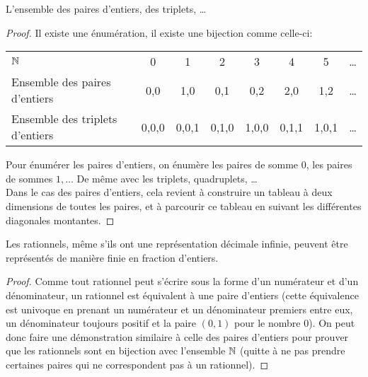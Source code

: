 \begin{myexem}
\label{exem:paire_entiers}
  L'ensemble des paires d'entiers, des triplets, \ldots
    \begin{proof}
        Il existe une énumération, il existe une bijection comme celle-ci:

		\begin{tabular}{ l c c  c  c c c  r }
			$\mathbb{N}$  & 0 & 1 & 2  & 3 & 4 & 5 & \ldots  \\
			Ensemble des paires d'entiers & {0,0} & {1,0} & {0,1} & {0,2} & {2,0} & {1,2}  & \ldots \\
			Ensemble des triplets d'entiers & {0,0,0} & {0,0,1} & {0,1,0} & {1,0,0} & {0,1,1} & {1,0,1}  & \ldots \\

		\end{tabular}

	Pour énumérer les paires d'entiers, on énumère les paires de somme 0, les paires de sommes $1, \ldots$ De même avec les triplets, quadruplets, \dots \\
	Dans le cas des paires d'entiers, cela revient à construire un tableau à deux dimensions de toutes les paires, et à parcourir ce tableau en suivant les différentes diagonales montantes.
    \end{proof}
\end{myexem}

\begin{myexem}
 Les rationnels, même s'ils ont une représentation décimale infinie, peuvent être représentés de manière finie en fraction d'entiers.
	 \begin{proof}
	 	 Comme tout rationnel peut s'écrire sous la forme d'un numérateur et d'un dénominateur, un rationnel est équivalent à une paire d'entiers (cette équivalence est univoque en prenant un numérateur et un dénominateur premiers entre eux, un dénominateur toujours positif et la paire $(0,1)$ pour le nombre $0$). On peut donc faire une démonstration similaire à celle des paires d'entiers pour prouver que les rationnels sont en bijection avec l'ensemble $\mathbb{N}$ (quitte à ne pas prendre certaines paires qui ne correspondent pas à un rationnel).
	 \end{proof}
 \end{myexem}

